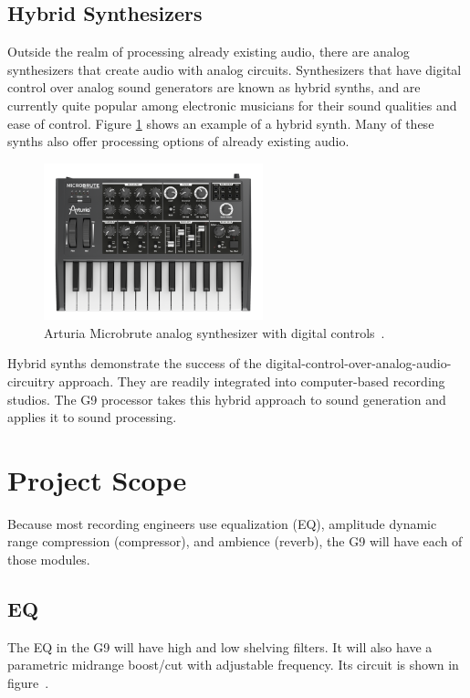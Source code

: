 \documentclass[journal]{IEEEtran}
\begin{document}
	\subsection{Hybrid Synthesizers}
	Outside the realm of processing already existing audio, there are analog synthesizers that create audio with analog circuits. Synthesizers that have digital control over analog sound generators are known as hybrid synths, and are currently quite popular among electronic musicians for their sound qualities and ease of control. Figure \ref{fig:analogSynth} shows an example of a hybrid synth. Many of these synths also offer processing options of already existing audio.
	
	\begin{figure}
		\centering
		\includegraphics[width=2.5in]{analogSynth}
		\caption{Arturia Microbrute analog synthesizer with digital controls~\cite{analogSynth}. }
		\label{fig:analogSynth}
	\end{figure}
	
	Hybrid synths demonstrate the success of the digital-control-over-analog-audio-circuitry approach. They are readily integrated into computer-based recording studios. The G9 processor takes this hybrid approach to sound generation and applies it to sound processing.
	
	
	
	\section{Project Scope}
	
	Because most recording engineers use equalization (EQ), amplitude dynamic range compression (compressor), and ambience (reverb), the G9 will have each of those modules.
	
	\subsection{EQ}
	The EQ in the G9 will have high and low shelving filters. It will also have a parametric midrange boost/cut with adjustable frequency. Its circuit is shown in figure~\cite{espEq}.
	
\end{document}
